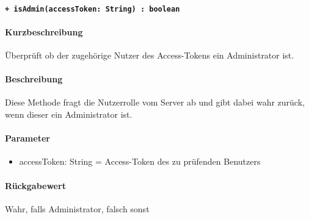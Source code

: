 \paragraph{\texttt{+ isAdmin(accessToken: String) : boolean}}\label{AP_Backend_isAdmin}%
\paragraph*{Kurzbeschreibung}
Überprüft ob der zugehörige Nutzer des Access-Tokens ein Administrator ist.
\paragraph*{Beschreibung}
Diese Methode fragt die Nutzerrolle vom Server ab und gibt dabei wahr zurück, wenn dieser ein Administrator ist.
\paragraph*{Parameter}
\begin{itemize}
    \item accessToken: String = Access-Token des zu prüfenden Benutzers
\end{itemize}
\paragraph*{Rückgabewert}
Wahr, falls Administrator, falsch sonst